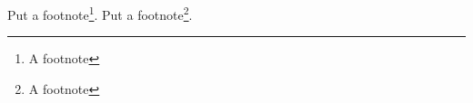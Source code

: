 \documentclass{article}
\begin{document}
Put a footnote\footnote{A footnote}.
\newpage
Put a footnote\footnote{A footnote}.
\end{document}
